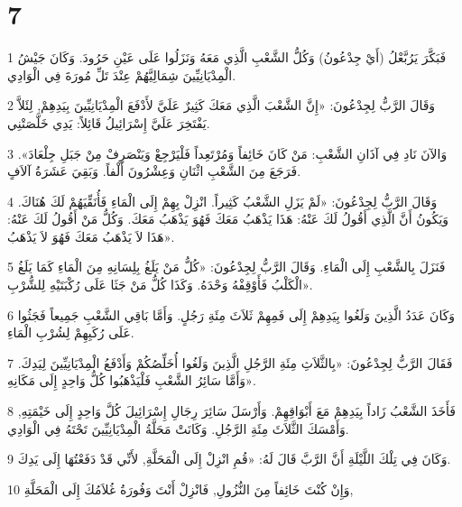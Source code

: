 \chapter{7}

\par 1 فَبَكَّرَ يَرُبَّعْلُ (أَيْ جِدْعُونُ) وَكُلُّ الشَّعْبِ الَّذِي مَعَهُ وَنَزَلُوا عَلَى عَيْنِ حَرُودَ. وَكَانَ جَيْشُ الْمِدْيَانِيِّينَ شِمَالِيَّهُمْ عِنْدَ تَلِّ مُورَةَ فِي الْوَادِي.
\par 2 وَقَالَ الرَّبُّ لِجِدْعُونَ: «إِنَّ الشَّعْبَ الَّذِي مَعَكَ كَثِيرٌ عَلَيَّ لأَدْفَعَ الْمِدْيَانِيِّينَ بِيَدِهِمْ, لِئَلاَّ يَفْتَخِرَ عَلَيَّ إِسْرَائِيلُ قَائِلاً: يَدِي خَلَّصَتْنِي.
\par 3 وَالآنَ نَادِ فِي آذَانِ الشَّعْبِ: مَنْ كَانَ خَائِفاً وَمُرْتَعِداً فَلْيَرْجِعْ وَيَنْصَرِفْ مِنْ جَبَلِ جِلْعَادَ». فَرَجَعَ مِنَ الشَّعْبِ اثْنَانِ وَعِشْرُونَ أَلْفاً. وَبَقِيَ عَشَرَةُ آلاَفٍ.
\par 4 وَقَالَ الرَّبُّ لِجِدْعُونَ: «لَمْ يَزَلِ الشَّعْبُ كَثِيراً. انْزِلْ بِهِمْ إِلَى الْمَاءِ فَأُنَقِّيَهُمْ لَكَ هُنَاكَ. وَيَكُونُ أَنَّ الَّذِي أَقُولُ لَكَ عَنْهُ: هَذَا يَذْهَبُ مَعَكَ فَهُوَ يَذْهَبُ مَعَكَ. وَكُلُّ مَنْ أَقُولُ لَكَ عَنْهُ: هَذَا لاَ يَذْهَبُ مَعَكَ فَهُوَ لاَ يَذْهَبُ».
\par 5 فَنَزَلَ بِالشَّعْبِ إِلَى الْمَاءِ. وَقَالَ الرَّبُّ لِجِدْعُونَ: «كُلُّ مَنْ يَلَغُ بِلِسَانِهِ مِنَ الْمَاءِ كَمَا يَلَغُ الْكَلْبُ فَأَوْقِفْهُ وَحْدَهُ. وَكَذَا كُلُّ مَنْ جَثَا عَلَى رُكْبَتَيْهِ لِلشُّرْبِ».
\par 6 وَكَانَ عَدَدُ الَّذِينَ وَلَغُوا بِيَدِهِمْ إِلَى فَمِهِمْ ثَلاَثَ مِئَةِ رَجُلٍ. وَأَمَّا بَاقِي الشَّعْبِ جَمِيعاً فَجَثُوا عَلَى رُكَبِهِمْ لِشُرْبِ الْمَاءِ.
\par 7 فَقَالَ الرَّبُّ لِجِدْعُونَ: «بِالثَّلاَثِ مِئَةِ الرَّجُلِ الَّذِينَ وَلَغُوا أُخَلِّصُكُمْ وَأَدْفَعُ الْمِدْيَانِيِّينَ لِيَدِكَ. وَأَمَّا سَائِرُ الشَّعْبِ فَلْيَذْهَبُوا كُلُّ وَاحِدٍ إِلَى مَكَانِهِ».
\par 8 فَأَخَذَ الشَّعْبُ زَاداً بِيَدِهِمْ مَعَ أَبْوَاقِهِمْ. وَأَرْسَلَ سَائِرَ رِجَالِ إِسْرَائِيلَ كُلَّ وَاحِدٍ إِلَى خَيْمَتِهِ, وَأَمْسَكَ الثَّلاَثَ مِئَةِ الرَّجُلِ. وَكَانَتْ مَحَلَّةُ الْمِدْيَانِيِّينَ تَحْتَهُ فِي الْوَادِي.
\par 9 وَكَانَ فِي تِلْكَ اللَّيْلَةِ أَنَّ الرَّبَّ قَالَ لَهُ: «قُمِ انْزِلْ إِلَى الْمَحَلَّةِ, لأَنِّي قَدْ دَفَعْتُهَا إِلَى يَدِكَ.
\par 10 وَإِنْ كُنْتَ خَائِفاً مِنَ النُّزُولِ, فَانْزِلْ أَنْتَ وَفُورَةُ غُلاَمُكَ إِلَى الْمَحَلَّةِ,

